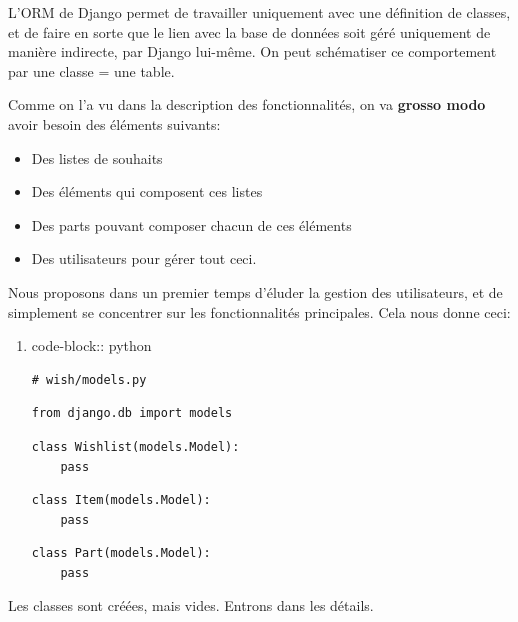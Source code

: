 \documentclass[11pt]{amsbook}
\begin{document}
L’ORM de Django permet de travailler uniquement avec une définition de classes, et de faire en sorte que le lien avec la base de données soit géré uniquement de manière indirecte, par Django lui-même. On peut schématiser ce comportement par  une classe = une table.


Comme on l’a vu dans la description des fonctionnalités, on va \textbf{grosso modo} avoir besoin des éléments suivants:


\begin{itemize}

\item Des listes de souhaits

\item Des éléments qui composent ces listes

\item Des parts pouvant composer chacun de ces éléments

\item Des utilisateurs pour gérer tout ceci.

\end{itemize}


Nous proposons dans un premier temps d’éluder la gestion des utilisateurs, et de simplement se concentrer sur les fonctionnalités principales.
Cela nous donne ceci:


\begin{enumerate}

\item{code-block:: python}

\begin{verbatim}
# wish/models.py
\end{verbatim}

\begin{verbatim}
from django.db import models
\end{verbatim}

\begin{verbatim}
class Wishlist(models.Model):
    pass
\end{verbatim}

\begin{verbatim}
class Item(models.Model):
    pass
\end{verbatim}

\begin{verbatim}
class Part(models.Model):
    pass
\end{verbatim}
\end{enumerate}


Les classes sont créées, mais vides. Entrons dans les détails.
\end{document}
